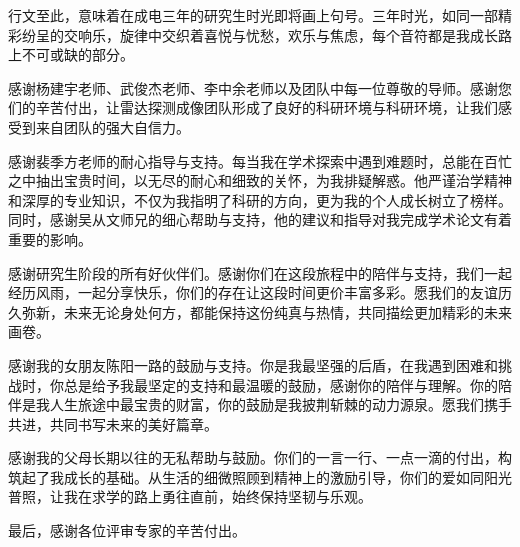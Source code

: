 \thesisacknowledgement

行文至此，意味着在成电三年的研究生时光即将画上句号。三年时光，如同一部精彩纷呈的交响乐，旋律中交织着喜悦与忧愁，欢乐与焦虑，每个音符都是我成长路上不可或缺的部分。

感谢杨建宇老师、武俊杰老师、李中余老师以及团队中每一位尊敬的导师。感谢您们的辛苦付出，让雷达探测成像团队形成了良好的科研环境与科研环境，让我们感受到来自团队的强大自信力。

感谢裴季方老师的耐心指导与支持。每当我在学术探索中遇到难题时，总能在百忙之中抽出宝贵时间，以无尽的耐心和细致的关怀，为我排疑解惑。他严谨治学精神和深厚的专业知识，不仅为我指明了科研的方向，更为我的个人成长树立了榜样。同时，感谢吴从文师兄的细心帮助与支持，他的建议和指导对我完成学术论文有着重要的影响。

感谢研究生阶段的所有好伙伴们。感谢你们在这段旅程中的陪伴与支持，我们一起经历风雨，一起分享快乐，你们的存在让这段时间更价丰富多彩。愿我们的友谊历久弥新，未来无论身处何方，都能保持这份纯真与热情，共同描绘更加精彩的未来画卷。

感谢我的女朋友陈阳一路的鼓励与支持。你是我最坚强的后盾，在我遇到困难和挑战时，你总是给予我最坚定的支持和最温暖的鼓励，感谢你的陪伴与理解。你的陪伴是我人生旅途中最宝贵的财富，你的鼓励是我披荆斩棘的动力源泉。愿我们携手共进，共同书写未来的美好篇章。

感谢我的父母长期以往的无私帮助与鼓励。你们的一言一行、一点一滴的付出，构筑起了我成长的基础。从生活的细微照顾到精神上的激励引导，你们的爱如同阳光普照，让我在求学的路上勇往直前，始终保持坚韧与乐观。

最后，感谢各位评审专家的辛苦付出。